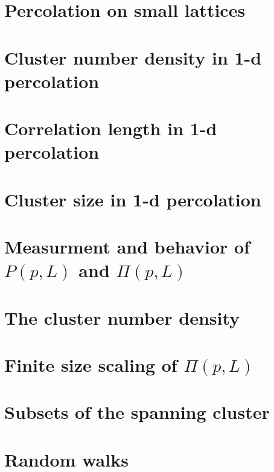 \documentclass[a4paper,english, 10pt, twoside]{article}
\begin{document}
\section{Percolation on small lattices}

\section{Cluster number density in 1-d percolation}

\section{Correlation length in 1-d percolation}

\section{Cluster size in 1-d percolation}

\section{Measurment and behavior of $P(p,L)$ and $\Pi(p,L)$}

\section{The cluster number density}

\section{Finite size scaling of $\Pi(p,L)$}

\section{Subsets of the spanning cluster}

\section{Random walks}
%   
\end{document}

